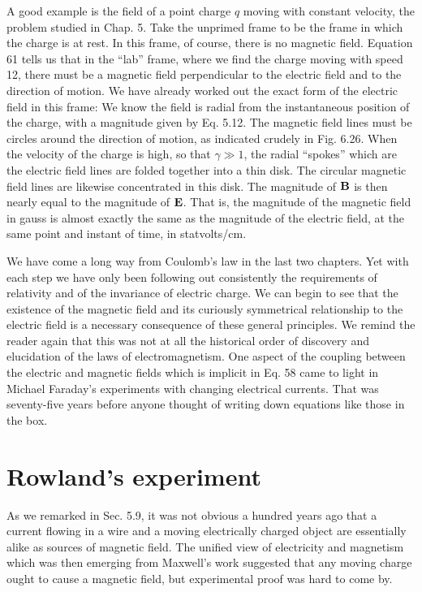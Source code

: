 A good example is the field of a point charge $q$ moving with constant
velocity, the problem studied in Chap. 5. Take the unprimed
frame to be the frame in which the charge is at rest. In this frame,
of course, there is no magnetic field. Equation 61 tells us that in the
``lab'' frame, where we find the charge moving with speed 12, there
must be a magnetic field perpendicular to the electric field and to the
direction of motion. We have already worked out the exact form of
the electric field in this frame: We know the field is radial from the
instantaneous position of the charge, with a magnitude given by
Eq. 5.12. The magnetic field lines must be circles around the direction
of motion, as indicated crudely in Fig. 6.26. When the velocity
of the charge is high, so that $\gamma\gg 1$, the radial ``spokes'' which are the
electric field lines are folded together into a thin disk. The circular
magnetic field lines are likewise concentrated in this disk. The magnitude
of $\mathbf{B}$ is then nearly equal to the magnitude of $\mathbf{E}$. That is, the
magnitude of the magnetic field in gauss is almost exactly the same
as the magnitude of the electric field, at the same point and instant
of time, in statvolts/cm.

We have come a long way from Coulomb's law in the last two
chapters. Yet with each step we have only been following out consistently
the requirements of relativity and of the invariance of electric
charge. We can begin to see that the existence of the magnetic
field and its curiously symmetrical relationship to the electric field
is a necessary consequence of these general principles. We remind
the reader again that this was not at all the historical order of discovery
and elucidation of the laws of electromagnetism. One aspect
of the coupling between the electric and magnetic fields which is
implicit in Eq. 58 came to light in Michael Faraday's experiments
with changing electrical currents. That was seventy-five years before
anyone thought of writing down equations like those in the box.

\section{Rowland's experiment}

As we remarked in Sec. 5.9, it was not obvious a hundred years
ago that a current flowing in a wire and a moving electrically charged
object are essentially alike as sources of magnetic field. The unified
view of electricity and magnetism which was then emerging from
Maxwell's work suggested that any moving charge ought to cause a
magnetic field, but experimental proof was hard to come by.

